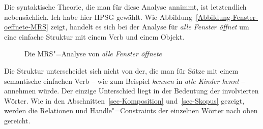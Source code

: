 Die syntaktische Theorie, die man für diese Analyse annimmt, ist letztendlich nebensächlich. Ich habe
hier HPSG gewählt. Wie Abbildung~\vref{Abbildung-Fenster-oeffnete-MRS} zeigt, handelt es sich bei der
Analyse für \emph{alle Fenster öffnet} um eine einfache Struktur mit einem Verb und einem Objekt.
\begin{figure}
\caption{\label{Abbildung-Fenster-oeffnete-MRS}Die MRS"=Analyse von \emph{alle Fenster öffnete}}
\end{figure}
Die Struktur unterscheidet sich nicht von der, die man für Sätze mit einem semantische einfachen
Verb -- wie zum Beispiel \emph{kennen} in \emph{alle Kinder kennt} -- annehmen würde. Der einzige
Unterschied liegt in der Bedeutung der involvierten Wörter.  Wie in den
Abschnitten~\ref{sec-Komposition} und~\ref{sec-Skopus} gezeigt, werden die Relationen und
Handle"=Constraints der einzelnen Wörter nach oben gereicht. 

